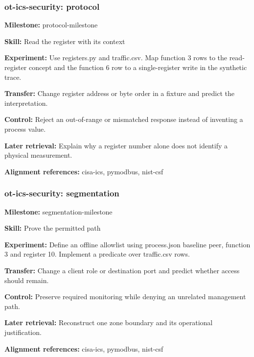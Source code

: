 \subsubsection{ot-ics-security: protocol}
\noindent\textbf{Milestone:} protocol-milestone\par
\noindent\textbf{Skill:} Read the register with its context\par
\noindent\textbf{Experiment:} Use registers.py and traffic.csv. Map function 3 rows to the read-register concept and the function 6 row to a single-register write in the synthetic trace.\par
\noindent\textbf{Transfer:} Change register address or byte order in a fixture and predict the interpretation.\par
\noindent\textbf{Control:} Reject an out-of-range or mismatched response instead of inventing a process value.\par
\noindent\textbf{Later retrieval:} Explain why a register number alone does not identify a physical measurement.\par
\noindent\textbf{Alignment references:} cisa-ics, pymodbus, nist-csf\par
\subsubsection{ot-ics-security: segmentation}
\noindent\textbf{Milestone:} segmentation-milestone\par
\noindent\textbf{Skill:} Prove the permitted path\par
\noindent\textbf{Experiment:} Define an offline allowlist using process.json baseline peer, function 3 and register 10. Implement a predicate over traffic.csv rows.\par
\noindent\textbf{Transfer:} Change a client role or destination port and predict whether access should remain.\par
\noindent\textbf{Control:} Preserve required monitoring while denying an unrelated management path.\par
\noindent\textbf{Later retrieval:} Reconstruct one zone boundary and its operational justification.\par
\noindent\textbf{Alignment references:} cisa-ics, pymodbus, nist-csf\par
